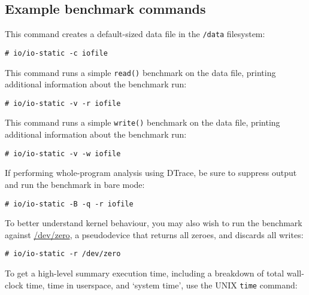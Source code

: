 \documentclass[a4paper,10pt]{article}
\newcommand{\code}[1]{\texttt{\small #1}}
\begin{document}
\subsection*{Example benchmark commands}

This command creates a default-sized data file in the \code{/data} filesystem:

\begin{lstlisting}[basicstyle=\small\ttfamily]
# io/io-static -c iofile
\end{lstlisting}

\noindent
This command runs a simple \code{read()} benchmark on the data file,
printing additional information about the benchmark run:

\begin{lstlisting}[basicstyle=\small\ttfamily]
# io/io-static -v -r iofile
\end{lstlisting}

\noindent
This command runs a simple \code{write()} benchmark on the data file,
printing additional information about the benchmark run:

\begin{lstlisting}[basicstyle=\small\ttfamily]
# io/io-static -v -w iofile
\end{lstlisting}

\noindent
If performing whole-program analysis using DTrace, be sure to suppress output
and run the benchmark in bare mode:

\begin{lstlisting}[basicstyle=\small\ttfamily]
# io/io-static -B -q -r iofile
\end{lstlisting}

%

\noindent
To better understand kernel behaviour, you may also wish to run the benchmark
against \url{/dev/zero}, a pseudodevice that returns all zeroes, and discards
all writes:

\begin{lstlisting}[basicstyle=\small\ttfamily]
# io/io-static -r /dev/zero
\end{lstlisting}

\noindent
To get a high-level summary execution time, including a breakdown of total
wall-clock time, time in userspace, and `system time', use the UNIX
\code{time} command:
\end{document}
